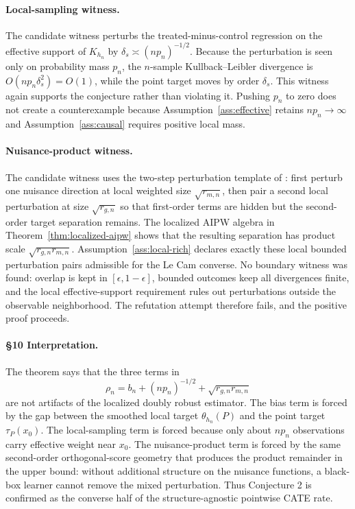 \paragraph{Local-sampling witness.}
The candidate witness perturbs the treated-minus-control regression on the effective support of $K_{h_n}$ by $\delta_s\asymp(n p_n)^{-1/2}$.  Because the perturbation is seen only on probability mass $p_n$, the $n$-sample Kullback--Leibler divergence is $O(n p_n\delta_s^2)=O(1)$, while the point target moves by order $\delta_s$.  This witness again supports the conjecture rather than violating it.  Pushing $p_n$ to zero does not create a counterexample because Assumption~\ref{ass:effective} retains $n p_n\to\infty$ and Assumption~\ref{ass:causal} requires positive local mass.

\paragraph{Nuisance-product witness.}
The candidate witness uses the two-step perturbation template of \cite{JinSyrgkanis2025GeneralLinearFunctionalLowerBounds}: first perturb one nuisance direction at local weighted size $\sqrt{r_{m,n}}$, then pair a second local perturbation at size $\sqrt{r_{g,n}}$ so that first-order terms are hidden but the second-order target separation remains.  The localized AIPW algebra in Theorem~\ref{thm:localized-aipw} shows that the resulting separation has product scale $\sqrt{r_{g,n}r_{m,n}}$.  Assumption~\ref{ass:local-rich} declares exactly these local bounded perturbation pairs admissible for the Le Cam converse.  No boundary witness was found: overlap is kept in $[\epsilon,1-\epsilon]$, bounded outcomes keep all divergences finite, and the local effective-support requirement rules out perturbations outside the observable neighborhood.  The refutation attempt therefore fails, and the positive proof proceeds.

\paragraph{\S10 Interpretation.}
The theorem says that the three terms in
\[
  \rho_n=b_n+(n p_n)^{-1/2}+\sqrt{r_{g,n}r_{m,n}}
\]
are not artifacts of the localized doubly robust estimator.  The bias term is forced by the gap between the smoothed local target $\theta_{h_n}(P)$ and the point target $\tau_P(x_0)$.  The local-sampling term is forced because only about $n p_n$ observations carry effective weight near $x_0$.  The nuisance-product term is forced by the same second-order orthogonal-score geometry that produces the product remainder in the upper bound: without additional structure on the nuisance functions, a black-box learner cannot remove the mixed perturbation.  Thus Conjecture 2 is confirmed as the converse half of the structure-agnostic pointwise CATE rate.

